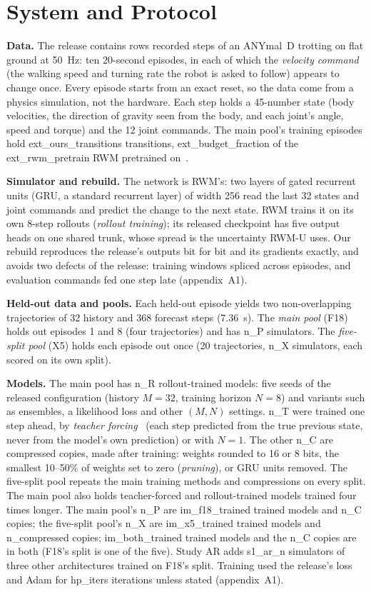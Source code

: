 \section{System and Protocol}\label{sec:setup}
\textbf{Data.} The release contains {{rows}} recorded steps of an ANYmal~D trotting on flat ground at 50~Hz: ten
20-second episodes, in each of which the \emph{velocity command} (the walking speed and turning rate the robot is
asked to follow) appears to change once. Every episode starts from an exact reset, so the data come from a physics
simulation, not the hardware. Each step holds a 45-number state (body velocities, the direction of gravity seen from
the body, and each joint's angle, speed and torque) and the 12 joint commands. The main pool's training episodes hold
{{ext_ours_transitions}} transitions, {{ext_budget_fraction}} of the {{ext_rwm_pretrain}} RWM pretrained
on~\cite[Table~1]{li2025rwm}.

\textbf{Simulator and rebuild.} The network is RWM's: two layers of gated recurrent units (GRU, a standard recurrent
layer) of width 256 read the last 32 states and joint commands and predict the change to the next state. RWM trains it
on its own 8-step rollouts (\emph{rollout training}); its released checkpoint has five output heads on one shared
trunk, whose spread is the uncertainty RWM-U uses. Our rebuild reproduces the release's outputs bit for bit and its
gradients exactly, and avoids two defects of the release: training windows spliced across episodes, and evaluation
commands fed one step late (appendix~A1).

\textbf{Held-out data and pools.} Each held-out episode yields two non-overlapping trajectories of 32 history and 368
forecast steps (7.36~s). The \emph{main pool} (F18) holds out episodes 1 and 8 (four trajectories) and has {{n_P}}
simulators. The \emph{five-split pool} (X5) holds each episode out once (20 trajectories, {{n_X}} simulators, each
scored on its own split).

\textbf{Models.} The main pool has {{n_R}} rollout-trained models: five seeds of the released configuration (history
$M=32$, training horizon $N=8$) and variants such as ensembles, a likelihood loss and other $(M,N)$ settings. {{n_T}}
were trained one step ahead, by \emph{teacher forcing}~\cite{williams1989} (each step predicted from the true previous
state, never from the model's own prediction) or with $N=1$. The other {{n_C}} are compressed copies, made after
training: weights rounded to 16 or 8 bits, the smallest 10--50\% of weights set to zero (\emph{pruning}), or GRU units
removed. The five-split pool repeats the main training methods and compressions on every split. The main pool also holds
teacher-forced and rollout-trained models trained four times longer.
The main pool's {{n_P}} are {{im_f18_trained}} trained models and {{n_C}} copies; the
five-split pool's {{n_X}} are {{im_x5_trained}} trained models and {{n_compressed}} copies; {{im_both_trained}} trained models and the {{n_C}}
copies are in both (F18's split is one of the five). Study AR adds {{s1_ar_n}} simulators of three other
architectures trained on F18's split. Training used the release's loss and Adam for {{hp_iters}} iterations unless stated (appendix~A1).

